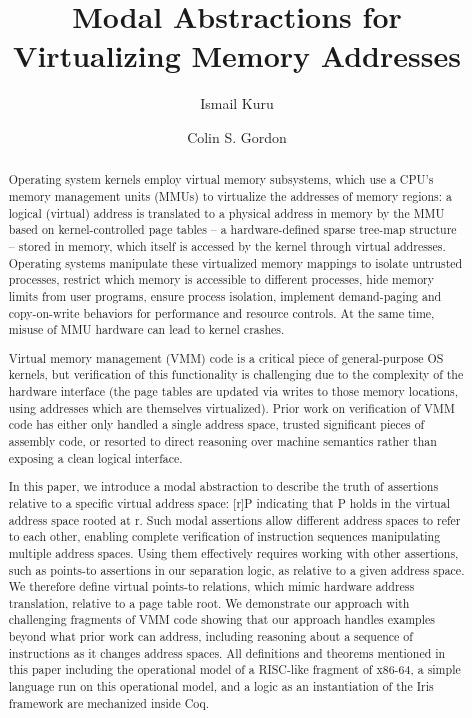 \documentclass[acmsmall,screen,nonacm]{acmart}
\begin{document}
%
%
%
\title{Modal Abstractions for Virtualizing Memory Addresses}
%
%
%
%
%
%
\author{Ismail Kuru}
\author{Colin S. Gordon}


%
%
%
%
%
%
\renewcommand{\shortauthors}{Kuru and Gordon}

%
%
%
\begin{abstract}
Operating system kernels employ virtual memory subsystems, which use a CPU's memory management units (MMUs) to virtualize the addresses of memory regions:
a logical (virtual) address is translated to a physical address in memory by the MMU based on
kernel-controlled page tables -- a hardware-defined sparse tree-map structure -- stored in memory, which itself is 
accessed by the kernel through virtual addresses.
Operating systems manipulate these virtualized memory mappings to isolate untrusted processes,
 restrict which memory is accessible to different processes, 
hide memory limits from user programs, 
ensure process isolation, implement demand-paging and copy-on-write behaviors for performance
and resource controls.
At the same time, misuse of MMU hardware can lead to kernel crashes.

Virtual memory management (VMM) code is a critical piece of general-purpose OS kernels, but verification of this functionality
is challenging due to the complexity of the hardware interface (the page tables are updated via writes to those
memory locations, using addresses which are themselves virtualized).
Prior work on verification of VMM code has either only handled a single address space, trusted significant
pieces of assembly code, or resorted to direct reasoning over machine semantics rather than
exposing a clean logical interface.

In this paper, we introduce a modal abstraction to describe
the truth of assertions relative to a specific virtual address space: [r]P indicating that P holds in the
virtual address space rooted at r. Such modal assertions 
allow different address spaces to refer to each other, enabling complete verification of instruction sequences
manipulating multiple address spaces. Using them effectively requires working with other assertions,
such as points-to assertions in our separation logic, as relative to a given address space.
We therefore define virtual points-to relations, which mimic hardware address translation,
relative to a page table root.
We demonstrate our approach with challenging fragments of VMM code showing that our approach
handles examples beyond what prior work can address, including reasoning about
a sequence of instructions as it changes address spaces.
All definitions and theorems mentioned in this paper including the operational model of a RISC-like fragment of x86-64, 
a simple language run on this operational model, and a logic as an instantiation of the Iris framework are mechanized 
inside Coq.
\end{abstract}
\end{document}
